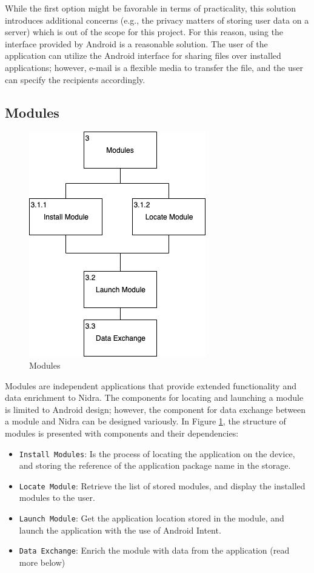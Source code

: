 While the first option might be favorable in terms of practicality, this solution introduces additional concerns (e.g., the privacy matters of storing user data on a server) which is out of the scope for this project. For this reason, using the interface provided by Android is a reasonable solution. The user of the application can utilize the Android interface for sharing files over installed applications; however, e-mail is a flexible media to transfer the file, and the user can specify the recipients accordingly.  

\subsection{Modules}\label{soc:modules}

\begin{figure}
    \centering
    \includegraphics[scale=0.6]{images/Modules.png}
    \caption{Modules}
    \label{fig:hta_modules}
\end{figure}

Modules are independent applications that provide extended functionality and data enrichment to Nidra. The components for locating and launching a module is limited to Android design; however, the component for data exchange between a module and Nidra can be designed variously.  In Figure \ref{fig:hta_modules}, the structure of modules is presented with components and their dependencies:   

\begin{itemize}
    \item[3.1.1] \verb|Install Modules|: Is the process of locating the application on the device, and storing the reference of the application package name in the storage.  
    \item[3.1.2] \verb|Locate Module|: Retrieve the list of stored modules, and display the installed modules to the user. 
    \item[3.2] \verb|Launch Module|: Get the application location stored in the module, and launch the application with the use of Android Intent. 
    \item[3.3] \verb|Data Exchange|: Enrich the module with data from the application (read more below)
\end{itemize}

